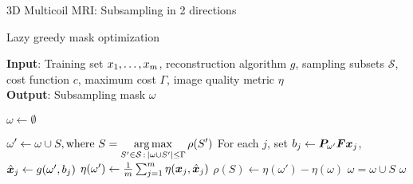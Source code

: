 \begin{frame}{3D Multicoil MRI: Subsampling in 2 directions}


\vspace{-.5cm}
\begin{algorithm}[H]
\caption{Lazy greedy mask optimization}
\label{alg:3}
\textbf{Input}: Training set $\*x_1, \ldots, \*x_m$, reconstruction algorithm $g$, sampling subsets $\mathcal{S}$, cost function $c$, maximum cost $\Gamma$, image quality metric $\eta$ \\
\textbf{Output}: Subsampling mask $\omega$
\begin{algorithmic}[1]
\State $\omega \leftarrow \emptyset$

\While{$ |\omega| \leq  \Gamma$}
	 \State $\displaystyle\omega' \leftarrow \omega \cup S, \text{where } S = \operatorname*{arg\,max}_{S' \in \mathcal S\,:\,|\omega \cup S'| \le \Gamma} \rho(S')$	 
        \State For each $j$, set  $\*b_{j} \leftarrow \mP_{\omega'}\mF\vx_j$, $\hat{\vx}_j \leftarrow g(\omega',\*b_j)$ 
        \State $\eta(\omega') \leftarrow \frac{1}{m}\sum_{j=1}^m \eta({\bm{x}}_j,\hat{{\bm{x}}}_j)$
        \State $\rho(S) \leftarrow \eta(\omega') - \eta(\omega) $%
	\State $\omega = \omega \cup S$
	\EndIf 
 \EndWhile
  $\omega$
\end{algorithmic}
\end{algorithm}
\end{frame}


